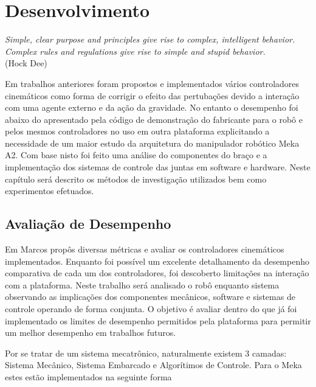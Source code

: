 \chapter{Desenvolvimento\label{ch:develop}}

\begin{flushright}
\textit{Simple, clear purpose and principles give rise to complex, intelligent behavior. Complex rules and regulations give rise to simple and stupid behavior.}\\(Hock Dee)
\end{flushright}

Em trabalhos anteriores foram propostos e implementados vários controladores cinemáticos como forma de corrigir o efeito das pertubações devido a interação com uma agente externo e da ação da gravidade. No entanto o desempenho foi abaixo do apresentado pela código de demonstração do fabricante para o robô e pelos mesmos controladores no uso em outra plataforma explicitando a necessidade de um maior estudo da arquitetura do manipulador robótico Meka A2. Com base nisto foi feito uma análise do componentes do braço e a implementação dos sistemas de controle das juntas em software e hardware. Neste capítulo será descrito os métodos de investigação utilizados bem como experimentos efetuados.

\section{Avaliação de Desempenho}

Em \cite{nocite} Marcos propôs diversas métricas e avaliar os controladores cinemáticos implementados. Enquanto foi possível um excelente detalhamento da desempenho comparativa de cada um dos controladores, foi descoberto limitações na interação com a plataforma. Neste trabalho será analisado o robô enquanto sistema observando as implicações dos componentes mecânicos, software e sistemas de controle operando de forma conjunta. O objetivo é avaliar dentro do que já foi implementado os limites de desempenho permitidos pela plataforma para permitir um melhor desempenho em trabalhos futuros. 


Por se tratar de um sistema mecatrônico, naturalmente existem 3 camadas: Sistema Mecânico, Sistema Embarcado e Algorítimos de Controle. Para o Meka estes estão implementados na seguinte forma

